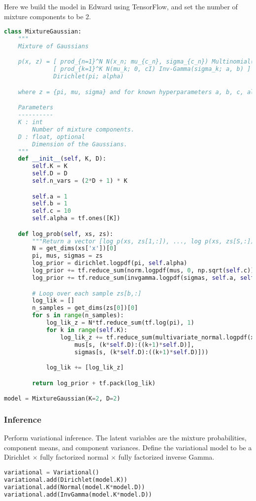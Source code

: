 Here we build the model in Edward using TensorFlow, and set the number
of mixture components to be 2.
\begin{lstlisting}[language=Python]
class MixtureGaussian:
    """
    Mixture of Gaussians

    p(x, z) = [ prod_{n=1}^N N(x_n; mu_{c_n}, sigma_{c_n}) Multinomial(c_n; pi) ]
              [ prod_{k=1}^K N(mu_k; 0, cI) Inv-Gamma(sigma_k; a, b) ]
              Dirichlet(pi; alpha)

    where z = {pi, mu, sigma} and for known hyperparameters a, b, c, alpha.

    Parameters
    ----------
    K : int
        Number of mixture components.
    D : float, optional
        Dimension of the Gaussians.
    """
    def __init__(self, K, D):
        self.K = K
        self.D = D
        self.n_vars = (2*D + 1) * K

        self.a = 1
        self.b = 1
        self.c = 10
        self.alpha = tf.ones([K])

    def log_prob(self, xs, zs):
        """Return a vector [log p(xs, zs[1,:]), ..., log p(xs, zs[S,:])]."""
        N = get_dims(xs['x'])[0]
        pi, mus, sigmas = zs
        log_prior = dirichlet.logpdf(pi, self.alpha)
        log_prior += tf.reduce_sum(norm.logpdf(mus, 0, np.sqrt(self.c)), 1)
        log_prior += tf.reduce_sum(invgamma.logpdf(sigmas, self.a, self.b), 1)

        # Loop over each sample zs[b,:]
        log_lik = []
        n_samples = get_dims(zs[0])[0]
        for s in range(n_samples):
            log_lik_z = N*tf.reduce_sum(tf.log(pi), 1)
            for k in range(self.K):
                log_lik_z += tf.reduce_sum(multivariate_normal.logpdf(xs['x'],
                    mus[s, (k*self.D):((k+1)*self.D)],
                    sigmas[s, (k*self.D):((k+1)*self.D)]))

            log_lik += [log_lik_z]

        return log_prior + tf.pack(log_lik)

model = MixtureGaussian(K=2, D=2)
\end{lstlisting}


\subsubsection{Inference}
Perform variational inference.
%
The latent variables are the mixture probabilities,
component means, and component variances.
Define the variational model to be a Dirichlet $\times$ fully factorized normal
$\times$ fully factorized inverse Gamma.
%
\begin{lstlisting}[language=Python]
variational = Variational()
variational.add(Dirichlet(model.K))
variational.add(Normal(model.K*model.D))
variational.add(InvGamma(model.K*model.D))
\end{lstlisting}

